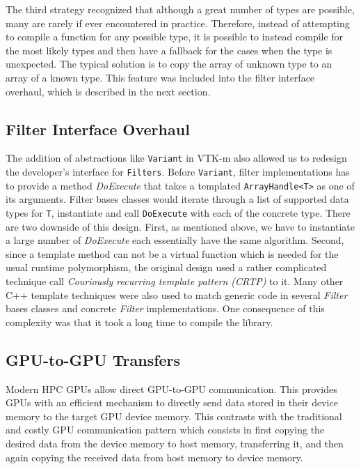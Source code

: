 The third strategy recognized that although a great number of types are possible, many are rarely if ever encountered in practice.
Therefore, instead of attempting to compile a function for any possible type, it is possible to instead compile for the most likely types and then have a fallback for the cases when the type is unexpected.
The typical solution is to copy the array of unknown type to an array of a known type.
This feature was included into the filter interface overhaul, which is described in the next section.

\subsection{Filter Interface Overhaul}


The addition of abstractions like \texttt{Variant} in VTK-m also allowed us to redesign the developer's interface for \texttt{Filters}. Before \texttt{Variant}, filter implementations has to provide a method \textit{DoExecute} that takes a templated \texttt{ArrayHandle<T>} as one of its arguments. Filter bases classes would iterate through a list of supported data types for \texttt{T}, instantiate and call \texttt{DoExecute} with each of the concrete type. There are two downside of this design. First, as mentioned above, we have to instantiate a large number of \textit{DoExecute} each essentially have the same algorithm. Second, since a template method can not be a virtual function which is needed for the usual runtime polymorphism, the original design used a rather complicated technique call \emph{Couriously recurring template pattern (CRTP)} to it. Many other C++ template techniques were also used to match generic code in several \textit{Filter} bases classes and concrete \textit{Filter} implementations. One consequence of this complexity was that it took a long time to compile the library. 

\subsection{GPU-to-GPU Transfers}

Modern HPC GPUs allow direct GPU-to-GPU communication. This provides GPUs with an efficient mechanism to directly send data stored in their device memory to the target GPU device memory. This contrasts with the traditional and costly GPU communication pattern which consists in first copying the desired data from the device memory to host memory, transferring it, and then again copying the received data from host memory to device memory.

